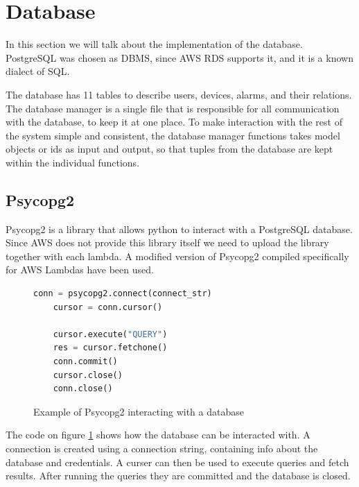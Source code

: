 


\section{Database}


In this section we will talk about the implementation of the database. PostgreSQL was chosen as DBMS, since AWS RDS supports it, and it is a known dialect of SQL.

The database has 11 tables to describe users, devices, alarms, and their relations. The database manager is a single file that is responsible for all communication with the database, to keep it at one place. To make interaction with the rest of the system simple and consistent, the database manager functions takes model objects or ids as input and output, so that tuples from the database are kept within the individual functions. 

\subsection{Psycopg2}
Psycopg2 is a library that allows python to interact with a PostgreSQL database. Since AWS does not provide this library itself we need to upload the library together with each lambda. A modified version of Psycopg2 compiled specifically for AWS Lambdas have been used.

\begin{figure}[H]
    \centering
    \begin{lstlisting}[language=Python]
    conn = psycopg2.connect(connect_str)
    cursor = conn.cursor()

    cursor.execute("QUERY")
    res = cursor.fetchone()
    conn.commit()
    cursor.close()
    conn.close()
\end{lstlisting}
    \caption{Example of Psycopg2 interacting with a database}
    \label{fig:psycopg2example}
\end{figure}

The code on figure \ref{fig:psycopg2example} shows how the database can be interacted with. A connection is created using a connection string, containing info about the database and credentials. A curser can then be used to execute queries and fetch results. After running the queries they are committed and the database is closed.

